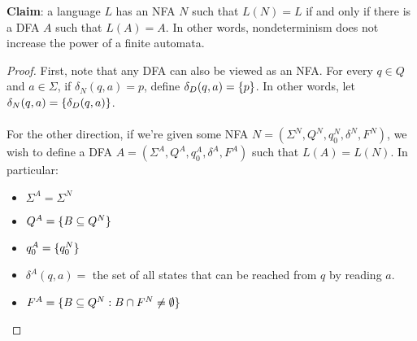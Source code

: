 \documentclass[]{article}
\DeclarePairedDelimiter{\set}{\lbrace}{\rbrace}
\theoremstyle{definition}
\begin{document}
          \textbf{Claim}: a language $L$ has an NFA $N$ such that $L(N) = L$ if and only if there is a DFA $A$ such that $L(A) = A$. In other words, nondeterminism does not increase the power of a finite automata.

          \begin{proof}
            First, note that any DFA can also be viewed as an NFA. For every $q \in Q$ and $a \in \Sigma$, if $\delta_N(q, a) = p$, define $\delta_D(q, a) = \set{p}$. In other words, let $\delta_N(q, a) = \set{\delta_D(q, a)}$.
            \\ \\
            For the other direction, if we're given some NFA $N = (\Sigma^N, Q^N, q_0^N, \delta^N, F^N)$, we wish to define a DFA $A = (\Sigma^A, Q^A, q_0^A, \delta^A, F^A)$ such that $L(A) = L(N)$. In particular:
            \begin{itemize}
              \item $\Sigma^A = \Sigma^N$
              \item $Q^A = \set{ B \subseteq Q^N }$
              \item $q_0^A = \set{ q_0^N }$
              \item $\delta^A(q, a) = $ the set of all states that can be reached from $q$ by reading $a$.
              \item $F^A = \set{ B \subseteq Q^N : B \cap F^N \ne \emptyset }$
            \end{itemize}
          \end{proof}
\end{document}

